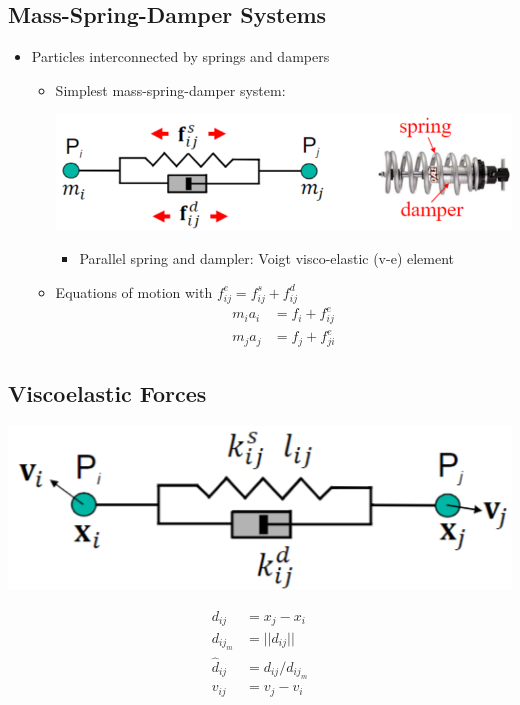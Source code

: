 \documentclass{article}
\begin{document}
\subsection*{Mass-Spring-Damper Systems}
\begin{itemize}
    \item Particles interconnected by springs and dampers
    \begin{itemize}
        \item Simplest mass-spring-damper system:
        \begin{center}
            \includegraphics*[scale=0.8]{W5_1.png}
        \end{center}
        \begin{itemize}
            \item Parallel spring and dampler: Voigt visco-elastic (v-e) element
        \end{itemize}
        \item Equations of motion with $f_{ij}^e = f_{ij}^s + f_{ij}^d$
        \begin{align*}
            m_i a_i &= f_i + f_{ij}^e\\
            m_j a_j &= f_j + f_{ji}^e
        \end{align*}
    \end{itemize}
\end{itemize}

\subsection*{Viscoelastic Forces}
\begin{center}
    \includegraphics*[scale=0.8]{W5_2.png}
\end{center}
\begin{align*}
    d_{ij} &= x_j - x_i\\
    d_{ij_m} &= \vert\vert d_{ij} \vert \vert\\
    \hat d_{ij} &= d_{ij} / d_{ij_m}\\
    v_{ij} &= v_j - v_i
\end{align*}
\end{document}
